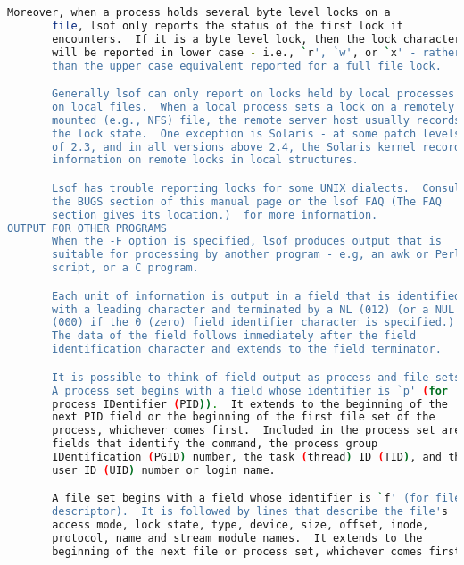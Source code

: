 {{\begin{lstlisting}[language=bash]
       Moreover, when a process holds several byte level locks on a
       file, lsof only reports the status of the first lock it
       encounters.  If it is a byte level lock, then the lock character
       will be reported in lower case - i.e., `r', `w', or `x' - rather
       than the upper case equivalent reported for a full file lock.

       Generally lsof can only report on locks held by local processes
       on local files.  When a local process sets a lock on a remotely
       mounted (e.g., NFS) file, the remote server host usually records
       the lock state.  One exception is Solaris - at some patch levels
       of 2.3, and in all versions above 2.4, the Solaris kernel records
       information on remote locks in local structures.

       Lsof has trouble reporting locks for some UNIX dialects.  Consult
       the BUGS section of this manual page or the lsof FAQ (The FAQ
       section gives its location.)  for more information.
OUTPUT FOR OTHER PROGRAMS
       When the -F option is specified, lsof produces output that is
       suitable for processing by another program - e.g, an awk or Perl
       script, or a C program.

       Each unit of information is output in a field that is identified
       with a leading character and terminated by a NL (012) (or a NUL
       (000) if the 0 (zero) field identifier character is specified.)
       The data of the field follows immediately after the field
       identification character and extends to the field terminator.

       It is possible to think of field output as process and file sets.
       A process set begins with a field whose identifier is `p' (for
       process IDentifier (PID)).  It extends to the beginning of the
       next PID field or the beginning of the first file set of the
       process, whichever comes first.  Included in the process set are
       fields that identify the command, the process group
       IDentification (PGID) number, the task (thread) ID (TID), and the
       user ID (UID) number or login name.

       A file set begins with a field whose identifier is `f' (for file
       descriptor).  It is followed by lines that describe the file's
       access mode, lock state, type, device, size, offset, inode,
       protocol, name and stream module names.  It extends to the
       beginning of the next file or process set, whichever comes first.


\end{lstlisting}}}
